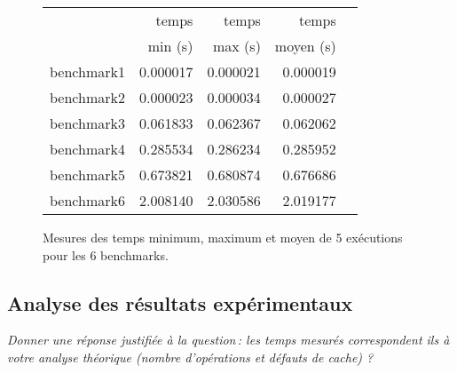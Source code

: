\documentclass[a4paper, 10pt, french]{article}
\begin{document}
    \begin{figure}[h]
      \begin{center}
        \begin{tabular}{|l||r||r|r|r||}
          \hline
          \hline
            & temps     & temps   & temps \\
            & min (s)   & max (s) & moyen (s)\\
          \hline
          \hline
            benchmark1 & 0.000017 & 0.000021 & 0.000019 \\
          \hline
            benchmark2 & 0.000023 & 0.000034 & 0.000027 \\
          \hline
            benchmark3 & 0.061833 & 0.062367 & 0.062062 \\
          \hline
            benchmark4 & 0.285534 & 0.286234 & 0.285952 \\
          \hline
            benchmark5 & 0.673821 & 0.680874 & 0.676686 \\
          \hline
            benchmark6 & 2.008140 & 2.030586 & 2.019177 \\
          \hline
          \hline
        \end{tabular}
        \caption{Mesures des temps minimum, maximum et moyen de 5 exécutions pour les 6 benchmarks.}
        \label{table-temps}
      \end{center}
    \end{figure}

\subsection{Analyse des résultats expérimentaux}
{\em Donner  une réponse justifiée  à la question\,: 
              les  temps mesurés correspondent ils  à votre analyse théorique (nombre d’opérations et défauts de cache) ?
}
\end{document}
